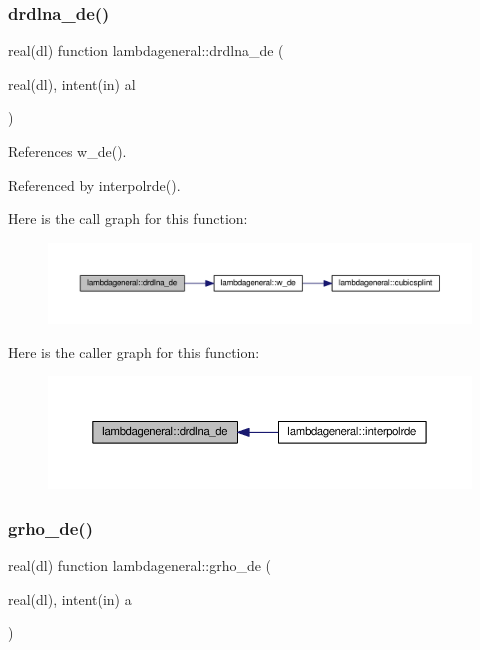 \subsubsection{\texorpdfstring{drdlna\+\_\+de()}{drdlna\_de()}}
{\footnotesize\ttfamily real(dl) function lambdageneral\+::drdlna\+\_\+de (\begin{DoxyParamCaption}\item[{real(dl), intent(in)}]{al }\end{DoxyParamCaption})}



References w\+\_\+de().



Referenced by interpolrde().

Here is the call graph for this function\+:
\nopagebreak
\begin{figure}[H]
\begin{center}
\leavevmode
\includegraphics[width=350pt]{namespacelambdageneral_a446a7b395384f258ea37364624b12206_cgraph}
\end{center}
\end{figure}
Here is the caller graph for this function\+:
\nopagebreak
\begin{figure}[H]
\begin{center}
\leavevmode
\includegraphics[width=350pt]{namespacelambdageneral_a446a7b395384f258ea37364624b12206_icgraph}
\end{center}
\end{figure}
\mbox{\label{namespacelambdageneral_a07db6feea7db4bda2dd9465dafa7895f}} 
\subsubsection{\texorpdfstring{grho\+\_\+de()}{grho\_de()}}
{\footnotesize\ttfamily real(dl) function lambdageneral\+::grho\+\_\+de (\begin{DoxyParamCaption}\item[{real(dl), intent(in)}]{a }\end{DoxyParamCaption})}



